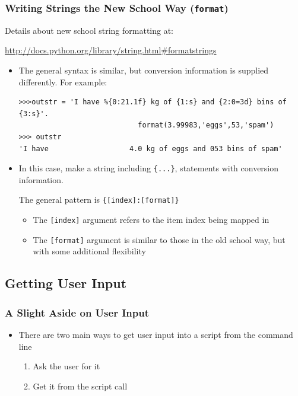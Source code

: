 \documentclass{beamer}
\newcommand\Fontvi{\fontsize{8.5}{7.2}\selectfont}
\begin{document}
\begin{frame}[fragile]
\frametitle{Writing Strings the New School Way (\texttt{format})}
Details about new school string formatting at:\newline{}
\begin{small}
\Fontvi
\url{http://docs.python.org/library/string.html#formatstrings}
\end{small}
\begin{itemize}
\item The general syntax is similar, but conversion information is supplied differently. For example:
\begin{lstlisting}
>>>outstr = 'I have %{0:21.1f} kg of {1:s} and {2:0=3d} bins of {3:s}'.
							format(3.99983,'eggs',53,'spam')
>>> outstr
'I have                   4.0 kg of eggs and 053 bins of spam'
\end{lstlisting}
\item In this case, make a string including \texttt{\{...\}}, statements with conversion information.

The general pattern is \texttt{\{[index]:[format]\}}\newline{}
\begin{itemize}
\item The \texttt{[index]} argument refers to the item index being mapped in\newline{}
\item The \texttt{[format]} argument is similar to those in the old school way, but with some additional flexibility
\end{itemize}
\end{itemize}
\end{frame}


\subsection{Getting User Input}
\begin{frame}[fragile]
\frametitle{A Slight Aside on User Input}
\begin{itemize}
\item There are two main ways to get user input into a script from the command line
\begin{enumerate}
\item Ask the user for it 
\item Get it from the script call
\end{enumerate}
\end{itemize}
\end{frame}
\end{document}
